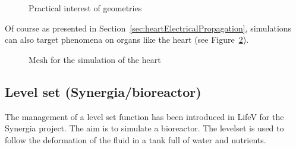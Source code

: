 \documentclass[11pt]{article}
\begin{document}
\begin{figure}[H]
{\label{fig:practicalInterestGeometries3}
}
\caption{Practical interest of geometries}
\label{fig:practicalInterestGeometries}
\end{figure}

Of course as presented in Section~\ref{sec:heartElectricalPropagation}, simulations can also target phenomena on organs like the heart (see Figure~\ref{fig:heartMesh}).

\begin{figure}[H]
\centering
{}
\caption{Mesh for the simulation of the heart}
\label{fig:heartMesh}
\end{figure}

\subsection{Level set (Synergia/bioreactor)}
The management of a level set function has been introduced in LifeV for the Synergia project. The aim is to simulate a bioreactor. The levelset is used to follow the deformation of the fluid in a tank full of water and nutrients.
\end{document}
